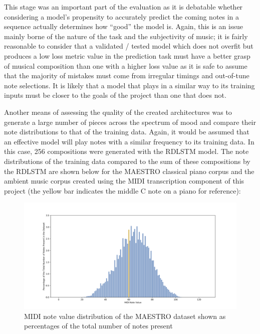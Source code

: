 \documentclass[12pt,]{article}
\begin{document}
This stage was an important part of the evaluation as it is debatable
whether considering a model's propensity to accurately predict the
coming notes in a sequence actually determines how ``good'' the model
is. Again, this is an issue mainly borne of the nature of the task and
the subjectivity of music; it is fairly reasonable to consider that a
validated / tested model which does not overfit but produces a low loss
metric value in the prediction task must have a better grasp of musical
composition than one with a higher loss value as it is safe to assume
that the majority of mistakes must come from irregular timings and
out-of-tune note selections. It is likely that a model that plays in a
similar way to its training inputs must be closer to the goals of the
project than one that does not.

Another means of assessing the quality of the created architectures was
to generate a large number of pieces across the spectrum of mood and
compare their note distributions to that of the training data. Again, it
would be assumed that an effective model will play notes with a similar
frequency to its training data. In this case, 256 compositions were
generated with the RDLSTM model. The note distributions of the training
data compared to the sum of these compositions by the RDLSTM are shown
below for the MAESTRO classical piano corpus and the ambient music
corpus created using the MIDI transcription component of this project
(the yellow bar indicates the middle C note on a piano for reference):

\begin{figure}
\centering
\includegraphics{Images/classicnotedistrib.png}
\caption{MIDI note value distribution of the MAESTRO dataset shown as
percentages of the total number of notes present}
\end{figure}
\end{document}
